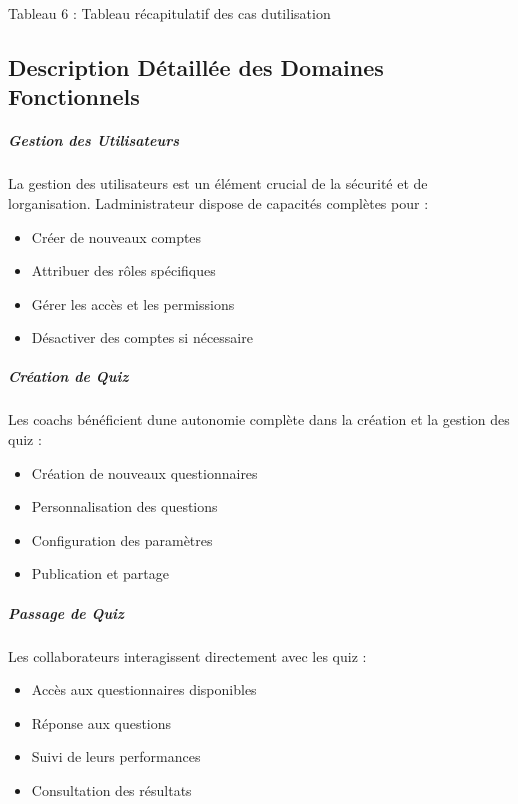 \documentclass[12pt,a4paper,twoside]{report}
\begin{document}
\protect\hypertarget{_Toc203823480}{}{}Tableau 6 : Tableau récapitulatif
des cas d\textquotesingle utilisation

\hypertarget{description-duxe9tailluxe9e-des-domaines-fonctionnels}{%
\subsection{Description Détaillée des Domaines
Fonctionnels}\label{description-duxe9tailluxe9e-des-domaines-fonctionnels}}

\hypertarget{gestion-des-utilisateurs-1}{%
\subparagraph{\texorpdfstring{ Gestion des
Utilisateurs}{ Gestion des Utilisateurs}}\label{gestion-des-utilisateurs-1}}

La gestion des utilisateurs est un élément crucial de la sécurité et de
l\textquotesingle organisation. L\textquotesingle administrateur dispose
de capacités complètes pour :

\begin{itemize}
\item
  Créer de nouveaux comptes
\item
  Attribuer des rôles spécifiques
\item
  Gérer les accès et les permissions
\item
  Désactiver des comptes si nécessaire
\end{itemize}

\hypertarget{cruxe9ation-de-quiz}{%
\subparagraph{\texorpdfstring{ Création de
Quiz}{ Création de Quiz}}\label{cruxe9ation-de-quiz}}

Les coachs bénéficient d\textquotesingle une autonomie complète dans la
création et la gestion des quiz :

\begin{itemize}
\item
  Création de nouveaux questionnaires
\item
  Personnalisation des questions
\item
  Configuration des paramètres
\item
  Publication et partage
\end{itemize}

\hypertarget{passage-de-quiz}{%
\subparagraph{Passage de Quiz}\label{passage-de-quiz}}

Les collaborateurs interagissent directement avec les quiz :

\begin{itemize}
\item
  Accès aux questionnaires disponibles
\item
  Réponse aux questions
\item
  Suivi de leurs performances
\item
  Consultation des résultats
\end{itemize}
\end{document}
